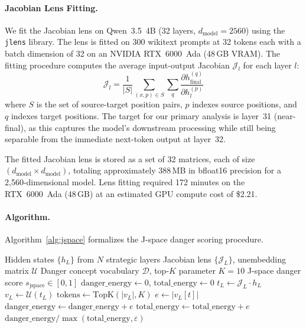 \documentclass[11pt]{article}
\newcommand{\lens}{\mathcal{J}}
\newcommand{\unembed}{\mathcal{U}}
\newcommand{\vocab}{\mathcal{V}}
\newcommand{\danger}{\mathcal{D}}
\begin{document}
\paragraph{Jacobian Lens Fitting.}
We fit the Jacobian lens on Qwen~3.5~4B (32 layers, $d_{\text{model}}=2560$) using the \texttt{jlens} library. The lens is fitted on 300 wikitext prompts at 32 tokens each with a batch dimension of 32 on an NVIDIA RTX~6000~Ada (48\,GB VRAM). The fitting procedure computes the average input-output Jacobian $\lens_l$ for each layer $l$:
\begin{equation}
\lens_l = \frac{1}{|S|} \sum_{(x,p) \in S} \sum_{q} \frac{\partial h_{\text{final}}^{(q)}}{\partial h_l^{(p)}}
\label{eq:lens_fit}
\end{equation}
where $S$ is the set of source-target position pairs, $p$ indexes source positions, and $q$ indexes target positions. The target for our primary analysis is layer~31 (near-final), as this captures the model's downstream processing while still being separable from the immediate next-token output at layer~32.

The fitted Jacobian lens is stored as a set of 32 matrices, each of size $(d_{\text{model}} \times d_{\text{model}})$, totaling approximately 388\,MB in bfloat16 precision for a 2,560-dimensional model. Lens fitting required 172 minutes on the RTX~6000~Ada (48\,GB) at an estimated GPU compute cost of \$2.21.

\paragraph{Algorithm.}
Algorithm~\ref{alg:jspace} formalizes the J-space danger scoring procedure.

\begin{algorithm}[H]
\caption{J-Space Danger Concept Scoring}
\label{alg:jspace}
\begin{algorithmic}[1]
\Require Hidden states $\{h_L\}$ from $N$ strategic layers
\Require Jacobian lens $\{\lens_L\}$, unembedding matrix $\unembed$
\Require Danger concept vocabulary $\danger$, top-$K$ parameter $K=10$
\Ensure J-space danger score $s_{\text{jspace}} \in [0,1]$
\State $\text{danger\_energy} \gets 0$, $\text{total\_energy} \gets 0$
    \State $t_L \gets \lens_L \cdot h_L$ 
    \State $v_L \gets \unembed(t_L)$ \Comment{$(|\vocab|,)$ — lens readout}
    \State $\text{tokens} \gets \text{TopK}(|v_L|, K)$
        \State $e \gets |v_L[t]|$
        \If{$t \in \danger$}
            \State $\text{danger\_energy} \gets \text{danger\_energy} + e$
        \EndIf
        \State $\text{total\_energy} \gets \text{total\_energy} + e$
    \EndFor
\EndFor
\State \Return $\text{danger\_energy} / \max(\text{total\_energy}, \varepsilon)$
\end{algorithmic}
\end{algorithm}
\end{document}
